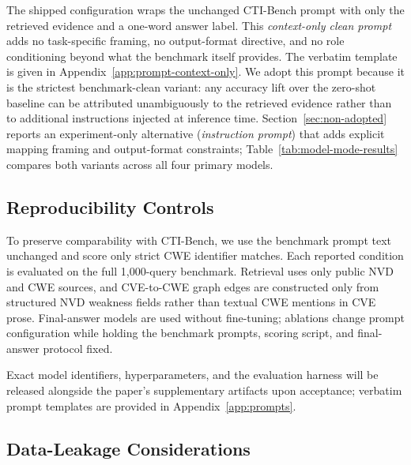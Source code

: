 The shipped configuration wraps the unchanged CTI-Bench prompt with only the retrieved evidence and a one-word answer label. This \emph{context-only clean prompt} adds no task-specific framing, no output-format directive, and no role conditioning beyond what the benchmark itself provides. The verbatim template is given in Appendix~\ref{app:prompt-context-only}. We adopt this prompt because it is the strictest benchmark-clean variant: any accuracy lift over the zero-shot baseline can be attributed unambiguously to the retrieved evidence rather than to additional instructions injected at inference time. Section~\ref{sec:non-adopted} reports an experiment-only alternative (\emph{instruction prompt}) that adds explicit mapping framing and output-format constraints; Table~\ref{tab:model-mode-results} compares both variants across all four primary models.

\subsection{Reproducibility Controls}

To preserve comparability with CTI-Bench, we use the benchmark prompt text unchanged and score only strict CWE identifier matches. Each reported condition is evaluated on the full 1{,}000-query benchmark. Retrieval uses only public NVD and CWE sources, and CVE-to-CWE graph edges are constructed only from structured NVD weakness fields rather than textual CWE mentions in CVE prose. Final-answer models are used without fine-tuning; ablations change prompt configuration while holding the benchmark prompts, scoring script, and final-answer protocol fixed.

Exact model identifiers, hyperparameters, and the evaluation harness will be released alongside the paper's supplementary artifacts upon acceptance; verbatim prompt templates are provided in Appendix~\ref{app:prompts}.

\subsection{Data-Leakage Considerations}
\label{sec:leakage}


